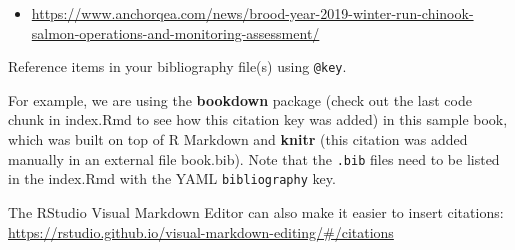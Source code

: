 \documentclass[
]{book}
\providecommand{\tightlist}{%
  \setlength{\itemsep}{0pt}\setlength{\parskip}{0pt}}
\theoremstyle{definition}
\theoremstyle{definition}
\theoremstyle{definition}
\theoremstyle{definition}
\theoremstyle{remark}
\begin{document}
\begin{itemize}
\tightlist
\item
  \url{https://www.anchorqea.com/news/brood-year-2019-winter-run-chinook-salmon-operations-and-monitoring-assessment/}
\end{itemize}

Reference items in your bibliography file(s) using \texttt{@key}.

For example, we are using the \textbf{bookdown} package \citep{R-bookdown} (check out the last code chunk in index.Rmd to see how this citation key was added) in this sample book, which was built on top of R Markdown and \textbf{knitr} \citep{xie2015} (this citation was added manually in an external file book.bib). Note that the \texttt{.bib} files need to be listed in the index.Rmd with the YAML \texttt{bibliography} key.

The RStudio Visual Markdown Editor can also make it easier to insert citations: \url{https://rstudio.github.io/visual-markdown-editing/\#/citations}

  
\end{document}
